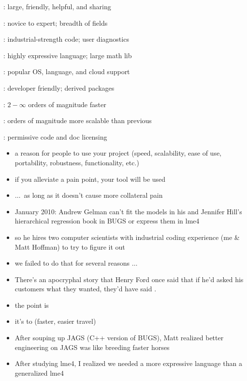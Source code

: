 \documentclass[9pt]{report}
\begin{document}
\vspace*{3pt}
\begin{subitemize}
\item {}: large, friendly, helpful, and sharing
\item {}:  novice to expert; breadth of fields
\item {}:  industrial-strength code; user diagnostics
\item {}:  highly expressive language;  large math lib
\item {}: popular OS, language, and cloud support
\item {}: developer friendly; derived packages
\item {}:  $2-\infty$ orders of magnitude faster
\item {}:  orders of magnitude more scalable than previous
\item {}: permissive code and doc licensing
\end{subitemize}


\begin{itemize}
\item a reason for people to use your project (speed, scalability,
  ease of use, portability, robustness, functionality, etc.)
\item if you alleviate a pain point, your tool will be used
\item $\ldots$\ as long as it doesn't cause more collateral pain
\item January 2010: Andrew Gelman can't fit the models in his and
  Jennifer Hill's hierarchical regression book
  in BUGS or express them in lme4
\item so he hires two computer scientists with industrial coding
  experience (me \& Matt Hoffman) to try to figure it out
\item we failed to do that for several reasons $\ldots$
\end{itemize}


\begin{itemize}
\item There's an apocryphal story that Henry Ford once said that
  if he'd asked his customers what they wanted, they'd have said
  .
\item the point is 
\item it's to  (faster, easier travel)
\item After souping up JAGS (C++ version of BUGS), Matt realized
  better engineering on JAGS was like breeding faster horses
\item After studying lme4, I realized we needed a more expressive
  language than a generalized lme4
\end{itemize}
\end{document}
